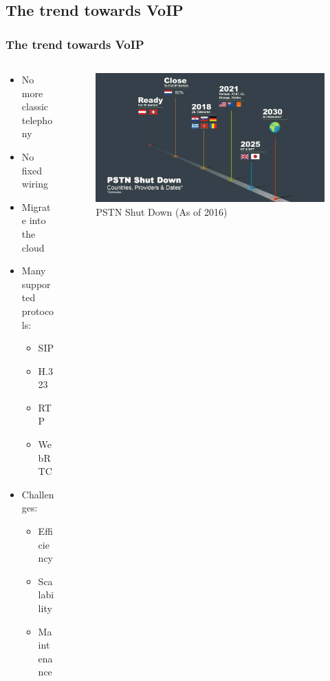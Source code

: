 \documentclass[11pt,t,usepdftitle=false,aspectratio=169]{beamer}
\begin{document}
\subsection{The trend towards VoIP}
\begin{frame}
	\frametitle{The trend towards {\color{uibkorange} VoIP}}
	
	\begin{columns}
		\begin{column}{0.4\textwidth}	
			\begin{itemize}
				\item No more classic telephony
				\item No fixed wiring
				\item Migrate into the cloud
				\item Many supported protocols:
				\begin{itemize}
					\item SIP
					\item H.323
					\item RTP
					\item WebRTC
				\end{itemize}
				\item Challenges:
				\begin{itemize}
					\item Efficiency
					\item Scalability
					\item Maintenance
				\end{itemize}
			\end{itemize}
		\end{column}
		
		\begin{column}{0.6\textwidth}
			\begin{figure}
				\centering
				\includegraphics[width=1\textwidth]{_images/pstn_shutdown.jpg}
				\caption{PSTN Shut Down (As of 2016) \cite{bib_pstn_shutdown}}
			\end{figure}
		\end{column}
	\end{columns}
\end{frame}
\end{document}

